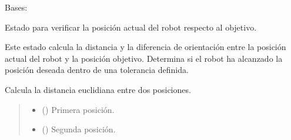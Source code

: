 \documentclass[a4paper,10pt,spanish]{sphinxmanual}
\begin{document}
\begin{fulllineitems}
\label{\detokenize{squad_approach_control_action:squad_approach_control_action.CheckPositionState}}
\pysigstartsignatures
{}
\pysigstopsignatures
\sphinxAtStartPar
Bases: 

\sphinxAtStartPar
Estado para verificar la posición actual del robot respecto al objetivo.

\sphinxAtStartPar
Este estado calcula la distancia y la diferencia de orientación entre la posición actual
del robot y la posición objetivo. Determina si el robot ha alcanzado la posición deseada
dentro de una tolerancia definida.

\begin{fulllineitems}
\label{\detokenize{squad_approach_control_action:squad_approach_control_action.CheckPositionState.calculate_distance}}
\pysigstartsignatures
{}
\pysigstopsignatures
\sphinxAtStartPar
Calcula la distancia euclidiana entre dos posiciones.
\begin{quote}\begin{description}
\begin{itemize}
\item {} 
\sphinxAtStartPar
{} () \textendash{} Primera posición.

\item {} 
\sphinxAtStartPar
{} () \textendash{} Segunda posición.


\end{itemize}
\end{description}
\end{quote}
\end{fulllineitems}
\end{fulllineitems}
\end{document}

